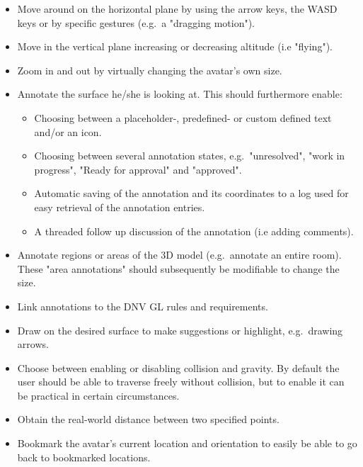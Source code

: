 \begin{itemize}
	\item Move around on the horizontal plane by using the arrow keys, the WASD keys or by specific gestures (e.g.~a "dragging motion").
	\item Move in the vertical plane increasing or decreasing altitude (i.e "flying").
	\item Zoom in and out by virtually changing the avatar's own size.
	\item Annotate the surface he/she is looking at. This should furthermore enable:
	\begin{itemize}
		\item Choosing between a placeholder-, predefined- or custom defined text and/or an icon.
		\item Choosing between several annotation states,  e.g.~"unresolved", "work in progress", "Ready for approval" and "approved".
		\item Automatic saving of the annotation and its coordinates to a log used for easy retrieval of the annotation entries. 
		\item A threaded follow up discussion of the annotation (i.e adding comments).
	\end{itemize}
	\item Annotate regions or areas of the 3D model (e.g.~annotate an entire room). These "area annotations" should subsequently be modifiable to change the size. 
	\item Link annotations to the DNV GL rules and requirements.
	\item Draw on the desired surface to make suggestions or highlight, e.g.~drawing arrows.
	\item Choose between enabling or disabling collision and gravity. By default the user should be able to traverse freely without collision, but to enable it can be practical in certain circumstances.
	\item Obtain the real-world distance between two specified points.
	\item Bookmark the avatar's current location and orientation to easily be able to go back to bookmarked locations. 
\end{itemize}


